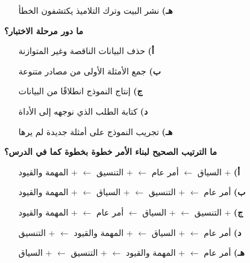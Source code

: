 \documentclass[11pt,a4paper]{article}
\begin{document}
\begin{multicols}{2}
\begin{minipage}{\linewidth}
\begin{itemize}[leftmargin=0.95cm, labelsep=4pt, itemsep=0pt, topsep=2pt, parsep=0pt]
  \item[\textbf{هـ)}] نشر البيت وترك التلاميذ يكتشفون الخطأ
\end{itemize}
\end{minipage}\par\vspace{7pt plus 4pt}
\noindent\begin{minipage}{\linewidth}
\hangindent=0.7cm\textbf{ما دور مرحلة الاختبار؟}
\begin{itemize}[leftmargin=0.95cm, labelsep=4pt, itemsep=0pt, topsep=2pt, parsep=0pt]
  \item[\textbf{أ)}] حذف البيانات الناقصة وغير المتوازنة
  \item[\textbf{ب)}] جمع الأمثلة الأولى من مصادر متنوعة
  \item[\textbf{ج)}] إنتاج النموذج انطلاقًا من البيانات
  \item[\textbf{د)}] كتابة الطلب الذي نوجهه إلى الأداة
  \item[\textbf{هـ)}] تجريب النموذج على أمثلة جديدة لم يرها
\end{itemize}
\end{minipage}\par\vspace{7pt plus 4pt}
\noindent\begin{minipage}{\linewidth}
\hangindent=0.7cm\textbf{ما الترتيب الصحيح لبناء الأمر خطوة بخطوة كما في الدرس؟}
\begin{itemize}[leftmargin=0.95cm, labelsep=4pt, itemsep=0pt, topsep=2pt, parsep=0pt]
  \item[\textbf{أ)}] + السياق $\leftarrow$ أمر عام $\leftarrow$ + التنسيق $\leftarrow$ + المهمة والقيود
  \item[\textbf{ب)}] أمر عام $\leftarrow$ + التنسيق $\leftarrow$ + السياق $\leftarrow$ + المهمة والقيود
  \item[\textbf{ج)}] + التنسيق $\leftarrow$ + السياق $\leftarrow$ أمر عام $\leftarrow$ + المهمة والقيود
  \item[\textbf{د)}] أمر عام $\leftarrow$ + السياق $\leftarrow$ + المهمة والقيود $\leftarrow$ + التنسيق
  \item[\textbf{هـ)}] أمر عام $\leftarrow$ + المهمة والقيود $\leftarrow$ + التنسيق $\leftarrow$ + السياق
\end{itemize}
\end{minipage}\par\vspace{7pt plus 4pt}
\noindent\begin{minipage}{\linewidth}

\end{minipage}
\end{multicols}
\end{document}
